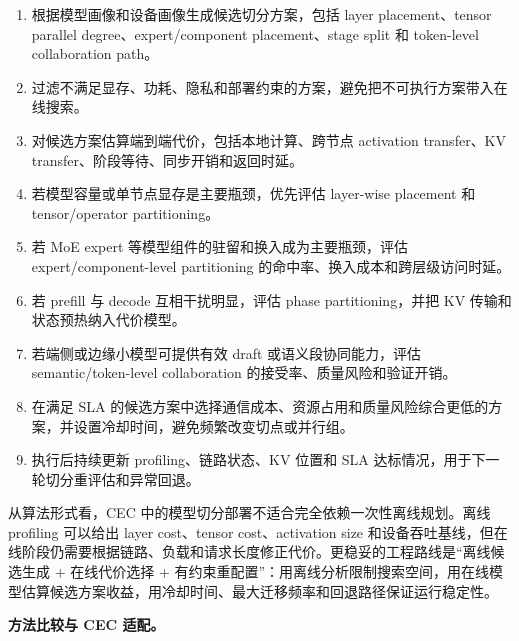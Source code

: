 \documentclass[a4paper,10pt]{ctexart}
\begin{document}
\begin{enumerate}
\item 根据模型画像和设备画像生成候选切分方案，包括 layer placement、tensor parallel degree、expert/component placement、stage split 和 token-level collaboration path。

\item 过滤不满足显存、功耗、隐私和部署约束的方案，避免把不可执行方案带入在线搜索。

\item 对候选方案估算端到端代价，包括本地计算、跨节点 activation transfer、KV transfer、阶段等待、同步开销和返回时延。

\item 若模型容量或单节点显存是主要瓶颈，优先评估 layer-wise placement 和 tensor/operator partitioning。

\item 若 MoE expert 等模型组件的驻留和换入成为主要瓶颈，评估 expert/component-level partitioning 的命中率、换入成本和跨层级访问时延。

\item 若 prefill 与 decode 互相干扰明显，评估 phase partitioning，并把 KV 传输和状态预热纳入代价模型。

\item 若端侧或边缘小模型可提供有效 draft 或语义段协同能力，评估 semantic/token-level collaboration 的接受率、质量风险和验证开销。

\item 在满足 SLA 的候选方案中选择通信成本、资源占用和质量风险综合更低的方案，并设置冷却时间，避免频繁改变切点或并行组。

\item 执行后持续更新 profiling、链路状态、KV 位置和 SLA 达标情况，用于下一轮切分重评估和异常回退。

\end{enumerate}
从算法形式看，CEC 中的模型切分部署不适合完全依赖一次性离线规划。离线 profiling 可以给出 layer cost、tensor cost、activation size 和设备吞吐基线，但在线阶段仍需要根据链路、负载和请求长度修正代价。更稳妥的工程路线是“离线候选生成 + 在线代价选择 + 有约束重配置”：用离线分析限制搜索空间，用在线模型估算候选方案收益，用冷却时间、最大迁移频率和回退路径保证运行稳定性。


\textbf{方法比较与 CEC 适配。}
\end{document}

